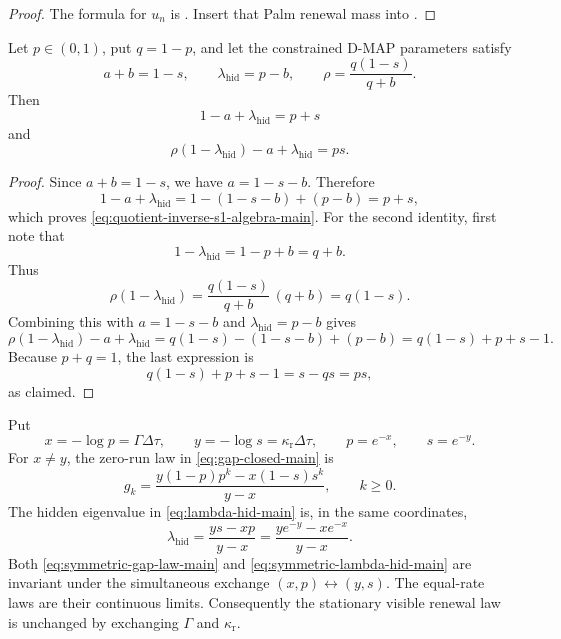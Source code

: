\begin{proof}
The formula for \(u_n\) is .  Insert that
Palm renewal mass into .
\end{proof}

\begin{lemma}\label{lem:quotient-inverse-symmetric-algebra-main}
Let \(p\in(0,1)\), put \(q=1-p\), and let the constrained D-MAP parameters satisfy
\[
a+b=1-s,\qquad
\lambda_{\mathrm{hid}}=p-b,\qquad
\rho=\frac{q(1-s)}{q+b}.
\]
Then
\begin{equation}\label{eq:quotient-inverse-s1-algebra-main}
1-a+\lambda_{\mathrm{hid}}=p+s
\end{equation}
and
\begin{equation}\label{eq:quotient-inverse-s2-algebra-main}
\rho(1-\lambda_{\mathrm{hid}})-a+\lambda_{\mathrm{hid}}=ps .
\end{equation}
\end{lemma}

\begin{proof}
Since \(a+b=1-s\), we have \(a=1-s-b\).  Therefore
\[
1-a+\lambda_{\mathrm{hid}}
=1-(1-s-b)+(p-b)
=p+s,
\]
which proves \eqref{eq:quotient-inverse-s1-algebra-main}.  For the second
identity, first note that
\[
1-\lambda_{\mathrm{hid}}=1-p+b=q+b.
\]
Thus
\[
\rho(1-\lambda_{\mathrm{hid}})
=\frac{q(1-s)}{q+b}\,(q+b)
=q(1-s).
\]
Combining this with \(a=1-s-b\) and \(\lambda_{\mathrm{hid}}=p-b\) gives
\[
\rho(1-\lambda_{\mathrm{hid}})-a+\lambda_{\mathrm{hid}}
=q(1-s)-(1-s-b)+(p-b)
=q(1-s)+p+s-1.
\]
Because \(p+q=1\), the last expression is
\[
q(1-s)+p+s-1
=s-qs
=ps,
\]
as claimed.
\end{proof}

\begin{lemma}\label{lem:gap-law-exchange-symmetry-main}
Put
\[
x=-\log p=\Gamma\Delta\tau,\qquad
y=-\log s=\kappa_{\mathrm r}\Delta\tau,
\qquad p=e^{-x},\qquad s=e^{-y}.
\]
For \(x\ne y\), the zero-run law in \eqref{eq:gap-closed-main} is
\begin{equation}\label{eq:symmetric-gap-law-main}
g_k=
\frac{y(1-p)p^k-x(1-s)s^k}{y-x},
\qquad k\ge0.
\end{equation}
The hidden eigenvalue in \eqref{eq:lambda-hid-main} is, in the same
coordinates,
\begin{equation}\label{eq:symmetric-lambda-hid-main}
\lambda_{\mathrm{hid}}
=\frac{y s-x p}{y-x}
=\frac{y e^{-y}-x e^{-x}}{y-x}.
\end{equation}
Both \eqref{eq:symmetric-gap-law-main} and
\eqref{eq:symmetric-lambda-hid-main} are invariant under the simultaneous
exchange \((x,p)\leftrightarrow(y,s)\).  The equal-rate laws are their
continuous limits.  Consequently the stationary visible renewal law is
unchanged by exchanging \(\Gamma\) and \(\kappa_{\mathrm r}\).
\end{lemma}

